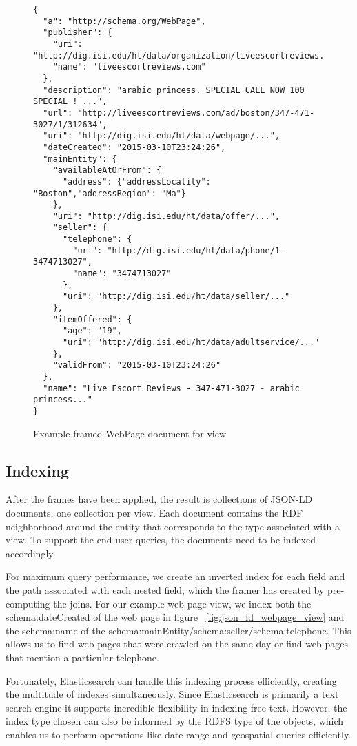 \begin{figure}[b]
\vspace{-0.2cm}
{\footnotesize
\begin{verbatim}
{
  "a": "http://schema.org/WebPage",
  "publisher": {
    "uri": "http://dig.isi.edu/ht/data/organization/liveescortreviews.com",
    "name": "liveescortreviews.com"
  },
  "description": "arabic princess. SPECIAL CALL NOW 100 SPECIAL ! ...",
  "url": "http://liveescortreviews.com/ad/boston/347-471-3027/1/312634",
  "uri": "http://dig.isi.edu/ht/data/webpage/...",
  "dateCreated": "2015-03-10T23:24:26",
  "mainEntity": {
    "availableAtOrFrom": {
      "address": {"addressLocality": "Boston","addressRegion": "Ma"}
    },
    "uri": "http://dig.isi.edu/ht/data/offer/...",
    "seller": {
      "telephone": {
        "uri": "http://dig.isi.edu/ht/data/phone/1-3474713027",
        "name": "3474713027"
      },
      "uri": "http://dig.isi.edu/ht/data/seller/..."
    },
    "itemOffered": {
      "age": "19",
      "uri": "http://dig.isi.edu/ht/data/adultservice/..."
    },
    "validFrom": "2015-03-10T23:24:26"
  },
  "name": "Live Escort Reviews - 347-471-3027 - arabic princess..."
}
\end{verbatim}}
\vspace{-0.2cm}
\caption{Example framed WebPage document for view}
\label{fig:framed-webpage}
\end{figure}
\subsection{Indexing}
After the frames have been applied, the result is collections of JSON-LD documents, one collection per view.  
Each document contains the RDF neighborhood around the entity that corresponds to the type associated with a view.  
To support the end user queries, the documents need to be indexed accordingly.  

For maximum query performance, we create an inverted index for each field and the path associated with each nested field, which the framer has created by pre-computing the joins.  
For our example web page view,  we index both the schema:dateCreated of the web page in figure ~\ref{fig:json_ld_webpage_view} and the schema:name of the schema:mainEntity/schema:seller/schema:telephone.  
This allows us to find web pages that were crawled on the same day or find web pages that mention a particular telephone.  

Fortunately, Elasticsearch can handle this indexing process efficiently, creating the multitude of indexes simultaneously.  
Since Elasticsearch is primarily a text search engine it supports incredible flexibility in indexing free text.  
However, the index type chosen can also be informed by the RDFS type of the objects, which enables us to perform operations like date range and geospatial queries efficiently.

